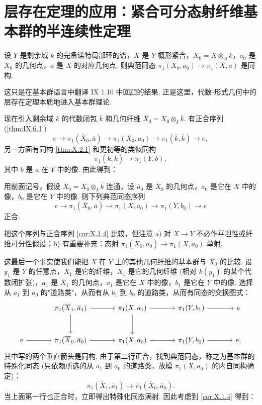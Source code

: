 \section{层存在定理的应用：紧合可分态射纤维基本群的半连续性定理}

\begin{theorem}\label{thm:X.2.1}
设 $Y$ 是剩余域 $k$ 的完备诺特局部环的谱，$X$ 是 $Y$-概形紧合，$X_0 = X \otimes_A k$，$a_0$ 是 $X_0$ 的几何点，$a$ 是 $X$ 的对应几何点. 则典范同态 $\pi_1(X_0, a_0) \to \pi_1(X, a)$ 是同构.
\end{theorem}

这只是在基本群语言中翻译 IX 1.10 中回顾的结果. 正是这里，代数-形式几何中的层存在定理本质地进入基本群理论.

现在引入剩余域 $k$ 的代数闭包 $\overline{k}$ 和几何纤维 $\overline{X}_0 = X_0 \otimes_k \overline{k}$. 有正合序列 (\cref{thm:IX.6.1})
\[
e \longrightarrow \pi_1(\overline{X}_0, \overline{a}) \longrightarrow \pi_1(X_0, a_0) \longrightarrow \pi_1(\overline{k}, \overline{k}) \longrightarrow e,
\]
另一方面有同构 \ref{thm:X.2.1} 和更初等的类似同构
\[
\pi_1(\overline{k}, \overline{k}) \longrightarrow \pi_1(Y, b),
\]
其中 $b$ 是 $a$ 在 $Y$ 中的像. 由此得到：

\begin{corollary}\label{cor:X.2.2}
用前面记号，假设 $\overline{X}_0 = X_0 \otimes_k \overline{k}$ 连通，设 $\overline{a}_0$ 是 $\overline{X}_0$ 的几何点，$a_0$ 是它在 $X$ 中的像，$b_0$ 是它在 $Y$ 中的像. 则下列典范同态序列
\[
e \longrightarrow \pi_1(\overline{X}_0, \overline{a}) \longrightarrow \pi_1(X, a_0) \longrightarrow \pi_1(Y, b_0) \longrightarrow e
\]
正合.
\end{corollary}

把这个序列与正合序列 \ref{cor:X.1.4} 比较，但注意 a) 对 $X \to Y$ 不必作平坦性或纤维可分性假设；b) 有重要补充：态射 $\pi_1(\overline{X}_0, \overline{a}_0) \to \pi_1(X, a_0)$ 单射.

这最后一个事实使我们能把 $X$ 在 $Y$ 上的其他几何纤维的基本群与 $\overline{X}_0$ 的比较. 设 $y_1$ 是 $Y$ 的任意点，$X_1$ 是它的纤维，$\overline{X}_1$ 是它的几何纤维 (相对 $k(y_1)$ 的某个代数闭扩张)，$a_1$ 是 $\overline{X}_1$ 的几何点，$a_1$ 是它在 $X$ 中的像，$b_1$ 是它在 $Y$ 中的像. 选择从 $a_1$ 到 $a_0$ 的"道路类"，从而有从 $b_1$ 到 $b_0$ 的道路类，从而有同态的交换图式：
\[
\begin{tikzcd}[row sep=large, column sep=large]
& \pi_1(\overline{X}_1, \overline{a}_1) \arrow[r] \arrow[d] & \pi_1(X, a_1) \arrow[r] \arrow[d] & \pi_1(Y, b_1) \arrow[r] & e \\
e \arrow[r] & \pi_1(\overline{X}_0, \overline{a}_0) \arrow[r] & \pi_1(X, a_0) \arrow[r] & \pi_1(Y, b_0) \arrow[r] & e,
\end{tikzcd}
\]
其中写的两个垂直箭头是同构. 由于第二行正合，找到典范同态，称之为基本群的特殊化同态 (只依赖所选的从 $a_1$ 到 $a_0$ 的道路类，故模 $\pi_1(X, a_0)$ 的内自同构确定)：
\[
\pi_1(\overline{X}_1, \overline{a}_1) \longrightarrow \pi_1(\overline{X}_0, \overline{a}_0).
\]
当上面第一行也正合时，立即得出特殊化同态满射. 因此考虑到 \ref{cor:X.1.4} 得到：

